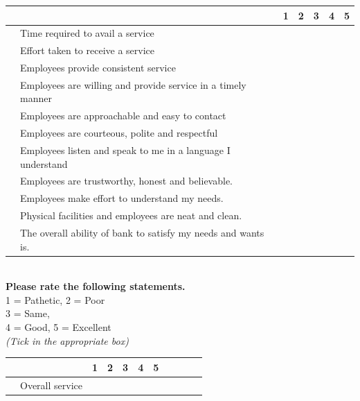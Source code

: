 \documentclass[a4paper, 12pt]{extarticle}
\newcounter{magicrownumbers}
\newcommand\rownumber{\stepcounter{magicrownumbers}\arabic{magicrownumbers}}
\newcommand\tab[1][1cm]{\hspace*{#1}}
\begin{document}
{\begin{minipage}{\textwidth}
\begin{tabularx}{\linewidth}{|l|l|X|X|X|X|X|}
\hline \multicolumn{2}{|c|}{} & 1 & 2 & 3 & 4 & 5\\
\hline \rownumber & Time required to avail a service & \tab & \tab & \tab & \tab & \tab \\
\hline \rownumber & Effort taken to receive a service & \tab & \tab & \tab & \tab & \tab \\
\hline \rownumber & Employees provide consistent service & \tab & \tab & \tab & \tab & \tab \\
\hline \rownumber & Employees are willing and provide service in a timely manner & \tab & \tab & \tab & \tab & \tab \\
\hline \rownumber & Employees are approachable and easy to contact & \tab & \tab & \tab & \tab & \tab \\
\hline \rownumber & Employees are courteous, polite and respectful & \tab & \tab & \tab & \tab & \tab \\
\hline \rownumber & Employees listen and speak to me in  a language I understand & \tab & \tab & \tab & \tab & \tab \\
\hline \rownumber & Employees are trustworthy, honest and believable. & \tab & \tab & \tab & \tab & \tab \\
\hline \rownumber & Employees make effort to understand my needs.  & \tab & \tab & \tab & \tab & \tab \\
\hline \rownumber & Physical facilities and employees are neat and clean. & \tab & \tab & \tab & \tab & \tab \\
\hline \rownumber & The overall ability of bank to satisfy my needs and wants is. & \tab & \tab & \tab & \tab & \tab \\
\hline
\end{tabularx}
\end{minipage}
\begin{minipage}{\textwidth}
\tab \\
\textbf{Please rate the following statements.}\\
1 = Pathetic, 2 = Poor\\
3 = Same,\\
4 = Good, 5 = Excellent\\
\emph {(Tick in the appropriate box)}\\
\begin{tabularx}{\linewidth}{|l|l|X|X|X|X|X|X|X|X|X|}
\hline \multicolumn{2}{|c|}{} & 1 & 2 & 3 & 4 & 5\\
\hline \rownumber & Overall service & \tab & \tab & \tab & \tab & \tab \\
\hline
\end{tabularx}
\end{minipage}
\newpage
}
\end{document}
